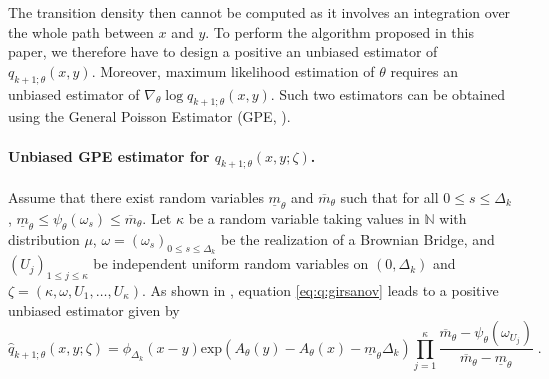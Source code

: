\documentclass{article}
\newcommand{\gpeUB}{\overline{m}_{\parvec}}
\newcommand{\gpeLB}{\underline{m}_{\parvec}}
\newcommand{\parvec}{\theta}
\newcommand{\hd}[1]{q_{#1}}
\newcommand{\hdhat}[1]{\widehat{q}_{#1}}
\newcommand{\eqsp}{\;}
\begin{document}
The transition density then cannot be computed as it involves an integration over the whole path between $x$ and $y$. 
To perform the algorithm proposed in this paper, we therefore have to design a positive an unbiased estimator of $\hd{k+1;\parvec}(x,y)$. 
Moreover, maximum likelihood estimation of $\theta$ requires an unbiased estimator of $\nabla_{\parvec}\log\hd{k+1;\parvec}(x,y)$. 
Such two estimators can be obtained using the General Poisson Estimator (GPE, \cite{fearnhead:papaspiliopoulos:roberts:2008}).

\paragraph{Unbiased GPE estimator for $\hd{k+1;\parvec}(x,y;\zeta)$.}

Assume that there exist random variables $\gpeLB$ and $\gpeUB$ such that for all $0\leqslant s \leqslant \Delta_k$, $\gpeLB \leqslant \psi_{\parvec}(\omega_s) \leqslant \gpeUB$. Let $\kappa$ be a random variable taking values in $\mathbb{N}$ with distribution $\mu$, $\omega = (\omega_s)_{0 \leq s \leq \Delta_k}$ be the realization of a Brownian Bridge, and $(U_j)_{1\leqslant j \leqslant \kappa}$ be independent uniform random
variables on $(0,\Delta_k)$ and $\zeta = (\kappa,\omega, U_1, \ldots , U_{\kappa})$. As
shown in \cite{fearnhead:papaspiliopoulos:roberts:2008}, equation \eqref{eq:q:girsanov} leads to a positive unbiased estimator given by
\[
\hdhat{k+1;\parvec}(x,y;\zeta) = \phi_{\Delta_k}(x-y)\mathrm{exp}\left(A_{\parvec}(y) - A_{\parvec}(x) - \gpeLB\Delta_k\right)\prod_{j=1}^{\kappa}\frac{\gpeUB-\psi_{\parvec}(\omega_{{U_j}})}{\gpeUB-\gpeLB}\eqsp.
\]
\end{document}
